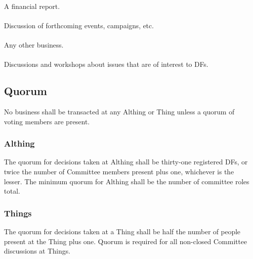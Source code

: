 \documentclass[a4paper, 11pt]{report}
\begin{document}
\paragraph{}
A financial report.
\paragraph{}
Discussion of forthcoming events, campaigns, etc. 
\paragraph{}
Any other business.
\paragraph{}
Discussions and workshops about issues that are of interest to DFs. 

\subsection{Quorum}
\label{sec:quorum}
No business shall be transacted at any Althing or Thing unless a quorum of voting
members are present.
\subsubsection{Althing} The quorum for decisions taken at Althing shall be thirty-one registered DFs, or twice the number of Committee members present plus one, whichever is the lesser. The minimum quorum for Althing shall be the number of committee roles total.
\subsubsection{Things} The quorum for decisions taken at a Thing shall be half the number of people present at the Thing plus one. Quorum is required for all non-closed Committee discussions at Things.
\end{document}
